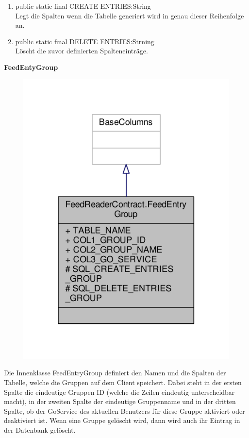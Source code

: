 \begin{enumerate}
	\item public static final CREATE ENTRIES:String\\
		Legt die Spalten wenn die Tabelle generiert wird in genau dieser Reihenfolge an.
	\item public static final DELETE ENTRIES:Strning\\
		Löscht die zuvor definierten Spalteneinträge.
\end{enumerate}

\textbf{FeedEntyGroup}
\begin{figure}[H]
	\includegraphics[scale = 1]{res/umlClasses/feed_reader_contract_group.pdf}
	\centering
\end{figure}
Die Innenklasse FeedEntryGroup definiert den Namen und die Spalten der Tabelle, welche die Gruppen auf dem Client speichert. 
Dabei steht in der ersten Spalte die eindeutige Gruppen ID (welche die Zeilen eindeutig unterscheidbar macht), in der zweiten Spalte der eindeutige Gruppenname und in der dritten Spalte, ob der GoService des aktuellen Benutzers für diese Gruppe aktiviert oder deaktiviert ist.
Wenn eine Gruppe gelöscht wird, dann wird auch ihr Eintrag in der Datenbank gelöscht.

